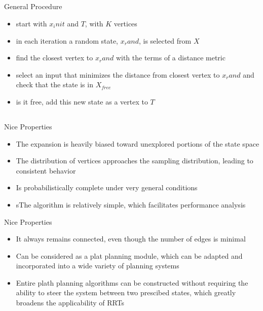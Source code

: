 \documentclass[%
  professionalfonts,%
  xcolor={%
    usenames,%
    dvipsnames,%
    svgnames,%
    table,%
    hyperref%
  }%
]{beamer}
\begin{document}
      \subsection*{}
      \begin{frame}{General Procedure}
        \begin{itemize}
          \item start with $x_init$ and $T$, with $K$ vertices
          \item in each iteration a random state, $x_rand$, is selected from $X$
          \item find the closest vertex to $x_rand$ with the terms of a distance metric
          \item select an input that minimizes the distance from closest vertex to $x_rand$ and check that the state is in $X_{free}$
          \item is it free, add this new state as a vertex to $T$
        \end{itemize}
      \end{frame}
      
      \subsection*{}
      \begin{frame}{Nice Properties}
        \begin{itemize}
          \item The expansion is heavily biased toward unexplored portions of the state space
          \item The distribution of vertices approaches the sampling distribution, leading to consistent behavior
          \item Is probabilistically complete under very general conditions
          \item sThe algorithm is relatively simple, which facilitates performance analysis
        \end{itemize}
      \end{frame}
      
      \begin{frame}{Nice Properties}
        \begin{itemize}
          \item It always remains connected, even though the number of edges is minimal
          \item Can be considered as a plat planning module, which can be adapted and incorporated into a wide variety of planning systems
          \item Entire plath planning algorithms can be constructed without requiring the ability to steer the system between two prescibed states, which greatly broadens the applicability of RRTs
        \end{itemize}
      \end{frame}
      
\end{document}
